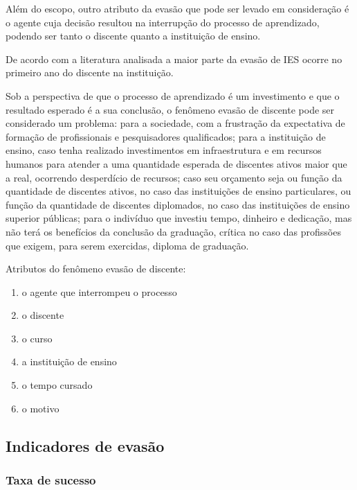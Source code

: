 \documentclass{report}
\begin{document}
Além do escopo, outro atributo da evasão que pode ser levado em consideração é o agente cuja decisão resultou na interrupção do processo de aprendizado, podendo ser tanto o discente quanto a instituição de ensino.


De acordo com a literatura analisada \cite{tinto_leaving} \cite{evasao_panorama} a maior parte da evasão de IES ocorre no primeiro ano do discente na instituição.

Sob a perspectiva de que o processo de aprendizado é um investimento e que o resultado esperado é a sua conclusão, o fenômeno evasão de discente pode ser considerado um problema: para a sociedade, com a frustração da expectativa de formação de profissionais e pesquisadores qualificados; para a instituição de ensino, caso tenha realizado investimentos em infraestrutura e em recursos humanos para atender a uma quantidade esperada de discentes ativos maior que a real, ocorrendo desperdício de recursos; caso seu orçamento seja ou função da quantidade de discentes ativos, no caso das instituições de ensino particulares, ou função da quantidade de discentes diplomados, no caso das instituições de ensino superior públicas; para o indivíduo que investiu tempo, dinheiro e dedicação, mas não terá os benefícios da conclusão da graduação, crítica no caso das profissões que exigem, para serem exercidas, diploma de graduação.

Atributos do fenômeno evasão de discente:

\begin{enumerate}
\item o agente que interrompeu o processo
\item o discente
\item o curso
\item a instituição de ensino
\item o tempo cursado
\item o motivo
\end{enumerate}

\subsection{Indicadores de evasão}

\subsubsection{Taxa de sucesso}
\end{document}
